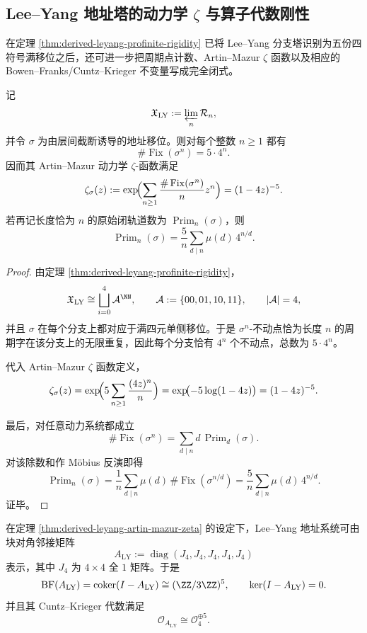 \subsection{Lee--Yang 地址塔的动力学 \texorpdfstring{$\zeta$}{zeta} 与算子代数刚性}

在定理 \ref{thm:derived-leyang-profinite-rigidity} 已将 Lee--Yang 分支塔识别为五份四符号满移位之后，还可进一步把周期点计数、Artin--Mazur \(\zeta\) 函数以及相应的 Bowen--Franks/Cuntz--Krieger 不变量写成完全闭式。

\begin{theorem}\label{thm:derived-leyang-artin-mazur-zeta}
记
\[
\mathfrak X_{\mathrm{LY}}:=\varprojlim_n \mathcal R_n,
\]
并令 \(\sigma\) 为由层间截断诱导的地址移位。则对每个整数 \(n\ge 1\) 都有
\[
\#\operatorname{Fix}(\sigma^n)=5\cdot 4^n.
\]
因而其 Artin--Mazur 动力学 \(\zeta\)-函数满足
\[
\zeta_{\sigma}(z)
:=
\exp\!\Bigl(\sum_{n\ge 1}\frac{\#\operatorname{Fix}(\sigma^n)}{n}z^n\Bigr)
=(1-4z)^{-5}.
\]
若再记长度恰为 \(n\) 的原始闭轨道数为 \(\operatorname{Prim}_n(\sigma)\)，则
\[
\operatorname{Prim}_n(\sigma)
=
\frac{5}{n}\sum_{d\mid n}\mu(d)\,4^{n/d}.
\]
\end{theorem}

\begin{proof}
由定理 \ref{thm:derived-leyang-profinite-rigidity}，
\[
\mathfrak X_{\mathrm{LY}}
\cong
\bigsqcup_{i=0}^{4}\mathcal A^{\NN},
\qquad
\mathcal A:=\{00,01,10,11\},
\qquad
|\mathcal A|=4,
\]
并且 \(\sigma\) 在每个分支上都对应于满四元单侧移位。于是 \(\sigma^n\)-不动点恰为长度 \(n\) 的周期字在该分支上的无限重复，因此每个分支恰有 \(4^n\) 个不动点，总数为 \(5\cdot 4^n\)。

代入 Artin--Mazur \(\zeta\) 函数定义，
\[
\zeta_{\sigma}(z)
=
\exp\!\Bigl(5\sum_{n\ge 1}\frac{(4z)^n}{n}\Bigr)
=
\exp\!\bigl(-5\log(1-4z)\bigr)
=(1-4z)^{-5}.
\]

最后，对任意动力系统都成立
\[
\#\operatorname{Fix}(\sigma^n)
=
\sum_{d\mid n} d\,\operatorname{Prim}_d(\sigma).
\]
对该除数和作 Möbius 反演即得
\[
\operatorname{Prim}_n(\sigma)
=
\frac{1}{n}\sum_{d\mid n}\mu(d)\,\#\operatorname{Fix}(\sigma^{n/d})
=
\frac{5}{n}\sum_{d\mid n}\mu(d)\,4^{n/d}.
\]
证毕。
\end{proof}

\begin{corollary}\label{cor:derived-leyang-bf-ck-rigidity}
在定理 \ref{thm:derived-leyang-artin-mazur-zeta} 的设定下，Lee--Yang 地址系统可由块对角邻接矩阵
\[
A_{\mathrm{LY}}:=\operatorname{diag}(J_4,J_4,J_4,J_4,J_4)
\]
表示，其中 \(J_4\) 为 \(4\times 4\) 全 \(1\) 矩阵。于是
\[
\mathrm{BF}(A_{\mathrm{LY}})
=
\operatorname{coker}(I-A_{\mathrm{LY}})
\cong
(\ZZ/3\ZZ)^5,
\qquad
\ker(I-A_{\mathrm{LY}})=0.
\]
并且其 Cuntz--Krieger 代数满足
\[
\mathcal O_{A_{\mathrm{LY}}}\cong \mathcal O_4^{\oplus 5}.
\]
\end{corollary}

